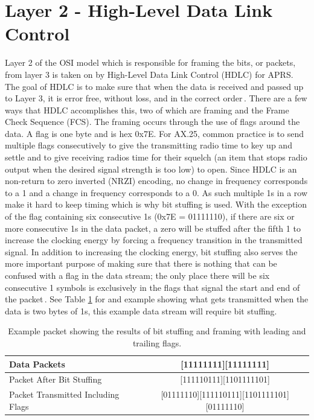 \section{Layer 2 - High-Level Data Link Control}
Layer 2 of the OSI model which is responsible for framing the bits, or packets, from layer 3 is taken on by High-Level Data Link Control (HDLC) for APRS. The goal of HDLC is to make sure that when the data is received and passed up to Layer 3, it is error free, without loss, and in the correct order\,\cite{Javvin2006}. There are a few ways that HDLC accomplishes this, two of which are framing and the Frame Check Sequence (FCS). The framing occurs through the use of flags around the data. A flag is one byte and is hex 0x7E. For AX.25, common practice is to send multiple flags consecutively to give the transmitting radio time to key up and settle and to give receiving radios time for their squelch (an item that stops radio output when the desired signal strength is too low) to open. Since HDLC is an non-return to zero inverted (NRZI) encoding, no change in frequency corresponds to a 1 and a change in frequency corresponds to a 0. As such multiple 1s in a row make it hard to keep timing which is why bit stuffing is used. With the exception of the flag containing six consecutive 1s (0x7E = 01111110), if there are six or more consecutive 1s in the data packet, a zero will be stuffed after the fifth 1 to increase the clocking energy by forcing a frequency transition in the transmitted signal. In addition to increasing the clocking energy, bit stuffing also serves the more important purpose of making sure that there is nothing that can be confused with a flag in the data stream; the only place there will be six consecutive 1 symbols is exclusively in the flags that signal the start and end of the packet\,\cite{Horzepa1992}. See Table \ref{bitStuffFrame} for and example showing what gets transmitted when the data is two bytes of 1s, this example data stream will require bit stuffing.
\begin{table}
	\begin{center}
		\begin{tabular}{ | l | c | }
		\hline
			Data Packets & [11111111][11111111] \\ \hline
			Packet After Bit Stuffing & [111110111][1101111101] \\ \hline
			Packet Transmitted Including Flags & [01111110][111110111][1101111101][01111110]\\
			\hline
		\end{tabular}
		\caption[Example of Bit Stuffing and Framing]{Example packet showing the results of bit stuffing and framing with leading and trailing flags.}
		\label{bitStuffFrame}
	\end{center}
\end{table}

